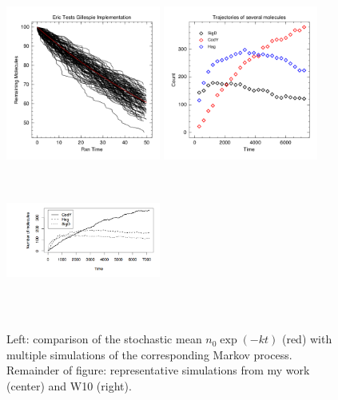 \documentclass{article}
\begin{document}
\begin{itemize}
\begin{figure}[h!]
\begin{center}
\includegraphics[height=2in,width=2in]{gillespie_test.png}
\includegraphics[height=2in,width=2in]{simulated_data_multiple_mols.png}
\includegraphics[height=2in,width=2in]{W10_representative_run.png}
\caption{ \label{fig:gillespie_test} Left: comparison of the stochastic mean $n_0\exp(-kt)$ (red) with multiple simulations of the corresponding Markov process. Remainder of figure: representative simulations from my work (center) and W10 (right).}
\end{center}
\end{figure}

%
\end{itemize}
\end{document}
